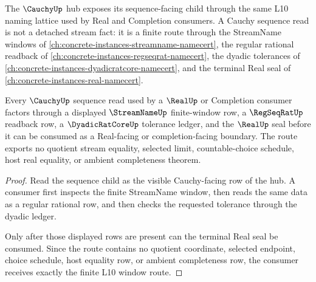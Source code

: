 The $\CauchyUp$ hub exposes its sequence-facing child through the same L10 naming lattice used by Real and Completion consumers. A Cauchy sequence read is not a detached stream fact: it is a finite route through the StreamName windows of \autoref{ch:concrete-instances-streamname-namecert}, the regular rational readback of \autoref{ch:concrete-instances-regseqrat-namecert}, the dyadic tolerances of \autoref{ch:concrete-instances-dyadicratcore-namecert}, and the terminal Real seal of \autoref{ch:concrete-instances-real-namecert}.

\begin{theorem}
\label{thm:cauchy-sequence-regseqrat-window-route}
Every $\CauchyUp$ sequence read used by a $\RealUp$ or Completion consumer factors through a displayed $\StreamNameUp$ finite-window row, a $\RegSeqRatUp$ readback row, a $\DyadicRatCoreUp$ tolerance ledger, and the $\RealUp$ seal before it can be consumed as a Real-facing or completion-facing boundary. The route exports no quotient stream equality, selected limit, countable-choice schedule, host real equality, or ambient completeness theorem.
\end{theorem}
\begin{proof}
Read the sequence child as the visible Cauchy-facing row of the hub. A consumer first inspects the finite StreamName window, then reads the same data as a regular rational row, and then checks the requested tolerance through the dyadic ledger.

Only after those displayed rows are present can the terminal Real seal be consumed. Since the route contains no quotient coordinate, selected endpoint, choice schedule, host equality row, or ambient completeness row, the consumer receives exactly the finite L10 window route.
\end{proof}
